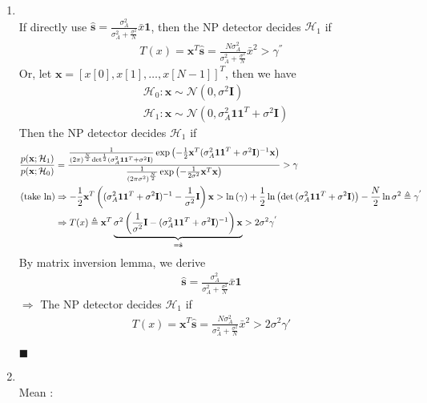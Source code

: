 \documentclass[a4paper,12pt]{article}
\begin{document}
\begin{enumerate}
        \item\ \\
            If directly use $\hat{\mathbf s}=\frac{\sigma_A^2}{\sigma_A^2+\frac{\sigma^2}{N}}\bar{x}\mathbf{1}$, then the NP detector decides $\mathcal H_1$ if
            \begin{align*}
                T(x) = \mathbf x^T\hat{\mathbf s}
                     =\frac{N\sigma_A^2}{\sigma_A^2+\frac{\sigma^2}{N}}\bar{x}^2
                     >\gamma^{''}
            \end{align*}
            Or, let $\mathbf x=[x[0],x[1],\dots,x[N-1]]^T$, then we have
            \begin{align*}
                &\mathcal H_0 : \mathbf x\sim\mathcal N(0,\sigma^2\mathbf I)\\
                &\mathcal H_1 : \mathbf x\sim\mathcal N(0,\sigma_A^2\mathbf{11}^T+\sigma^2\mathbf I)
            \end{align*}
            Then the NP detector decides $\mathcal H_1$ if
            \begin{align*}
                \frac{p(\mathbf x;\mathcal H_1)}{p(\mathbf x;\mathcal H_0)} &= \frac{\frac{1}{(2\pi)^{\frac{N}{2}}{\det}^{\frac{1}{2}}(\sigma_A^2\mathbf{11}^T+\sigma^2\mathbf I)}\exp{\left(-\frac{1}{2}\mathbf x^T(\sigma_A^2\mathbf{11}^T+\sigma^2\mathbf I)^{-1}\mathbf x\right)}}{\frac{1}{(2\pi\sigma^2)^{\frac{N}{2}}}\exp{\left(-\frac{1}{2\sigma^2}\mathbf x^T\mathbf x\right)}}>\gamma\\
                ({\rm take\ ln}) &\Rightarrow -\frac{1}{2}\mathbf x^T\left((\sigma_A^2\mathbf{11}^T+\sigma^2\mathbf I)^{-1}-\frac{1}{\sigma^2}\mathbf I\right)\mathbf x>\ln{(\gamma)}+\frac{1}{2}\ln\left(\det{(\sigma_A^2\mathbf{11}^T+\sigma^2\mathbf I)}\right)-\frac{N}{2}\ln{\sigma^2}\triangleq \gamma^{'}\\
                &\Rightarrow T(x)\triangleq \mathbf x^T\underbrace{\sigma^{2}\left(\frac{1}{\sigma^2}\mathbf I-(\sigma_A^2\mathbf{11}^T+\sigma^2\mathbf I)^{-1}\right)\mathbf x}_{=\hat{\mathbf s}}>2\sigma^2\gamma^{'}
            \end{align*}
            By matrix inversion lemma, we derive
            \begin{align*}
                \hat{\mathbf s}=\frac{\sigma_A^2}{\sigma_A^2+\frac{\sigma^2}{N}}\bar{x}\mathbf{1}
            \end{align*}
            $\Rightarrow$ The NP detector decides $\mathcal H_1$ if
            \begin{align*}
                T(x) = \mathbf x^T\hat{\mathbf s}
                     =\frac{N\sigma_A^2}{\sigma_A^2+\frac{\sigma^2}{N}}\bar{x}^2
                     >2\sigma^2\gamma{'}
            \end{align*}
            \begin{flushright}
                $\blacksquare$
            \end{flushright}
        \item\ \\
        Mean : 
        

\end{enumerate}
\end{document}
